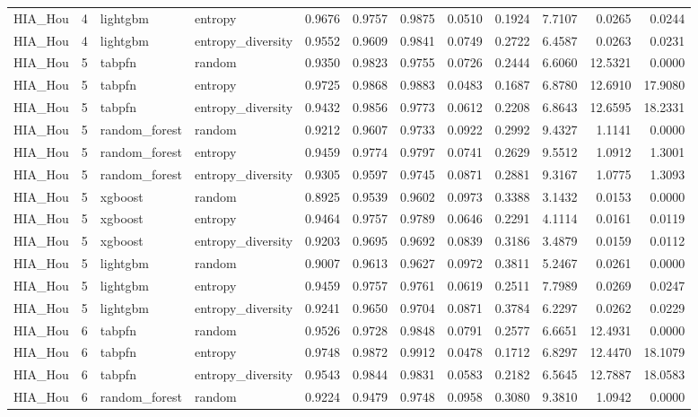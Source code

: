 \begin{tabular}{lrllrrrrrrrr}
HIA_Hou & 4 & lightgbm & entropy & 0.9676 & 0.9757 & 0.9875 & 0.0510 & 0.1924 & 7.7107 & 0.0265 & 0.0244 \\
HIA_Hou & 4 & lightgbm & entropy_diversity & 0.9552 & 0.9609 & 0.9841 & 0.0749 & 0.2722 & 6.4587 & 0.0263 & 0.0231 \\
HIA_Hou & 5 & tabpfn & random & 0.9350 & 0.9823 & 0.9755 & 0.0726 & 0.2444 & 6.6060 & 12.5321 & 0.0000 \\
HIA_Hou & 5 & tabpfn & entropy & 0.9725 & 0.9868 & 0.9883 & 0.0483 & 0.1687 & 6.8780 & 12.6910 & 17.9080 \\
HIA_Hou & 5 & tabpfn & entropy_diversity & 0.9432 & 0.9856 & 0.9773 & 0.0612 & 0.2208 & 6.8643 & 12.6595 & 18.2331 \\
HIA_Hou & 5 & random_forest & random & 0.9212 & 0.9607 & 0.9733 & 0.0922 & 0.2992 & 9.4327 & 1.1141 & 0.0000 \\
HIA_Hou & 5 & random_forest & entropy & 0.9459 & 0.9774 & 0.9797 & 0.0741 & 0.2629 & 9.5512 & 1.0912 & 1.3001 \\
HIA_Hou & 5 & random_forest & entropy_diversity & 0.9305 & 0.9597 & 0.9745 & 0.0871 & 0.2881 & 9.3167 & 1.0775 & 1.3093 \\
HIA_Hou & 5 & xgboost & random & 0.8925 & 0.9539 & 0.9602 & 0.0973 & 0.3388 & 3.1432 & 0.0153 & 0.0000 \\
HIA_Hou & 5 & xgboost & entropy & 0.9464 & 0.9757 & 0.9789 & 0.0646 & 0.2291 & 4.1114 & 0.0161 & 0.0119 \\
HIA_Hou & 5 & xgboost & entropy_diversity & 0.9203 & 0.9695 & 0.9692 & 0.0839 & 0.3186 & 3.4879 & 0.0159 & 0.0112 \\
HIA_Hou & 5 & lightgbm & random & 0.9007 & 0.9613 & 0.9627 & 0.0972 & 0.3811 & 5.2467 & 0.0261 & 0.0000 \\
HIA_Hou & 5 & lightgbm & entropy & 0.9459 & 0.9757 & 0.9761 & 0.0619 & 0.2511 & 7.7989 & 0.0269 & 0.0247 \\
HIA_Hou & 5 & lightgbm & entropy_diversity & 0.9241 & 0.9650 & 0.9704 & 0.0871 & 0.3784 & 6.2297 & 0.0262 & 0.0229 \\
HIA_Hou & 6 & tabpfn & random & 0.9526 & 0.9728 & 0.9848 & 0.0791 & 0.2577 & 6.6651 & 12.4931 & 0.0000 \\
HIA_Hou & 6 & tabpfn & entropy & 0.9748 & 0.9872 & 0.9912 & 0.0478 & 0.1712 & 6.8297 & 12.4470 & 18.1079 \\
HIA_Hou & 6 & tabpfn & entropy_diversity & 0.9543 & 0.9844 & 0.9831 & 0.0583 & 0.2182 & 6.5645 & 12.7887 & 18.0583 \\
HIA_Hou & 6 & random_forest & random & 0.9224 & 0.9479 & 0.9748 & 0.0958 & 0.3080 & 9.3810 & 1.0942 & 0.0000 \\

\end{tabular}
